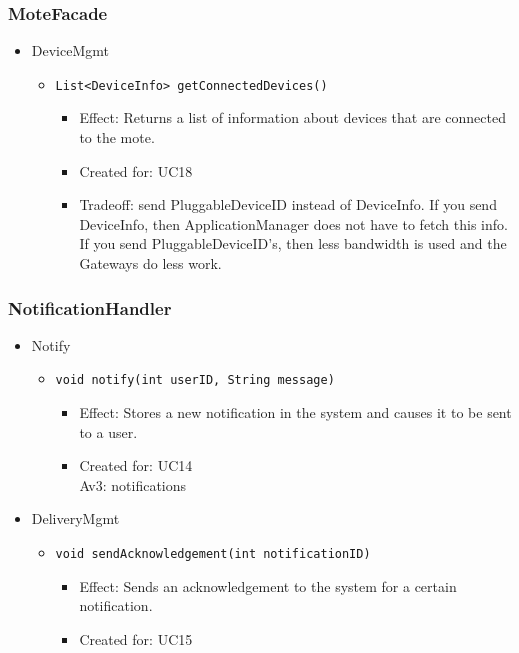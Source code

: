     \subsubsection{MoteFacade}
        \begin{itemize}
            \item DeviceMgmt
            \begin{itemize}
                \item \texttt{List<DeviceInfo> getConnectedDevices()}
                \begin{itemize}
                    \item Effect: Returns a list of information about devices that are connected to the mote.
                    \item Created for: UC18
                    \item Tradeoff: send PluggableDeviceID instead of DeviceInfo.
                          If you send DeviceInfo, then ApplicationManager does
                          not have to fetch this info.
                          If you send PluggableDeviceID's, then less bandwidth
                          is used and the Gateways do less work.
                \end{itemize}
            \end{itemize}
        \end{itemize}

    \subsubsection{NotificationHandler}
        \begin{itemize}
            \item Notify
            \begin{itemize}
                \item \texttt{void notify(int userID, String message)}
                \begin{itemize}
                    \item Effect: Stores a new notification in the system and
                          causes it to be sent to a user.
                    \item Created for: UC14 \\
                          Av3: notifications
                \end{itemize}
            \end{itemize}

            \item DeliveryMgmt
            \begin{itemize}
                \item \texttt{void sendAcknowledgement(int notificationID)}
                \begin{itemize}
                    \item Effect: Sends an acknowledgement to the system for a certain notification.
                    \item Created for: UC15
                \end{itemize}
            \end{itemize}
        \end{itemize}

